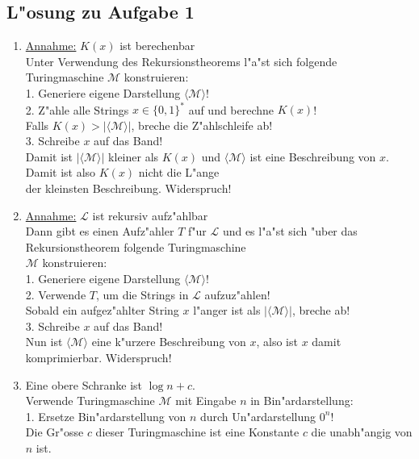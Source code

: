 \documentclass[10pt,oneside,onecolumn,a4paper,german,titlepage]{article}
\begin{document}
\subsection*{L"osung zu Aufgabe 1}
\begin{enumerate}
\item \underline{Annahme:} $K(x)$ ist berechenbar\\
Unter Verwendung des Rekursionstheorems l"a"st sich folgende Turingmaschine
$\mathcal{M}$ konstruieren:\\[4pt]
1. Generiere eigene Darstellung $\langle\mathcal{M}\rangle$!\\
2. Z"ahle alle Strings $x \in \{0,1\}^*$ auf und berechne $K(x)$!\\
\hspace*{0.4cm} Falls $K(x) > |\langle\mathcal{M}\rangle|$, breche die Z"ahlschleife
ab!\\
3. Schreibe $x$ auf das Band!\\[4pt]
Damit ist $|\langle\mathcal{M}\rangle|$ kleiner als $K(x)$ und $\langle\mathcal{M}
\rangle$ ist eine Beschreibung von $x$. Damit ist also $K(x)$ nicht die L"ange\\
der kleinsten Beschreibung. Widerspruch!
\item \underline{Annahme:} $\mathcal{L}$ ist rekursiv aufz"ahlbar\\
Dann gibt es einen Aufz"ahler $T$ f"ur $\mathcal{L}$ und es l"a"st sich "uber das
Rekursionstheorem folgende Turingmaschine\\ $\mathcal{M}$ konstruieren:\\[4pt]
1. Generiere eigene Darstellung $\langle\mathcal{M}\rangle$!\\
2. Verwende $T$, um die Strings in $\mathcal{L}$ aufzuz"ahlen!\\
\hspace*{0.4cm} Sobald ein aufgez"ahlter String $x$ l"anger ist als $|\langle
\mathcal{M}\rangle|$, breche ab!\\
3. Schreibe $x$ auf das Band!\\[4pt]
Nun ist $\langle\mathcal{M}\rangle$ eine k"urzere Beschreibung von $x$, also ist $x$
damit komprimierbar. Widerspruch!
\item Eine obere Schranke ist $\log n + c$.\\
Verwende Turingmaschine $\mathcal{M}$ mit Eingabe $n$ in Bin"ardarstellung:\\
1. Ersetze Bin"ardarstellung von $n$ durch Un"ardarstellung $0^n$!\\
Die Gr"osse $c$ dieser Turingmaschine ist eine Konstante $c$ die unabh"angig von $n$ ist.


\end{enumerate}
\end{document}

